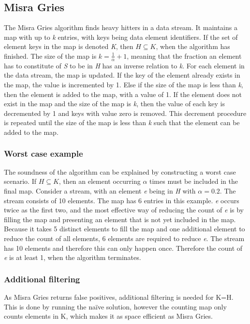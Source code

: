\subsection{Misra Gries}
The Misra Gries algorithm finds heavy hitters in a data stream. It maintains a map with up to \textit{k} entries, with keys being data element identifiers. If the set of element keys in the map is denoted \textit{K}, then 
\begin{math}
	H \subseteq K
\end{math}, when the algorithm has finished. The size of the map is 
\begin{math}
	k = \frac{1}{\alpha} + 1
\end{math}, meaning that the fraction an element has to constitute of \textit{S} to be in \textit{H} has an inverse relation to \textit{k}.
For each element in the data stream, the map is updated. If the key of the element already exists in the map, the value is incremented by 1. Else if the size of the map is less than \textit{k}, then the element is added to the map, with a value of 1. If the element does not exist in the map and the size of the map is \textit{k}, then the value of each key is decremented by 1 and keys with value zero is removed. This decrement procedure is repeated until the size of the map is less than \textit{k} such that the element can be added to the map.

\subsubsection{Worst case example}
The soundness of the algorithm can be explained by constructing a worst case scenario. If \(H \subseteq K\), then an element occurring \(\alpha\) times must be included in the final map. Consider a stream, with an element \textit{e} being in \textit{H} with \(\alpha = 0.2\). The stream consists of 10 elements. The map has 6 entries in this example. \textit{e} occurs twice as the first two, and the most effective way of reducing the count of \textit{e} is by filling the map and presenting an element that is not yet included in the map. Because it takes 5 distinct elements to fill the map and one additional element to reduce the count of all elements, 6 elements are required to reduce \textit{e}. The stream has 10 elements and therefore this can only happen once. Therefore the count of \textit{e} is at least 1, when the algorithm terminates.

\subsubsection{Additional filtering}
As Misra Gries returns false positives, additional filtering is needed for K=H. This is done by running the naïve solution, however the counting map only counts elements in K, which makes it as space efficient as Misra Gries.

